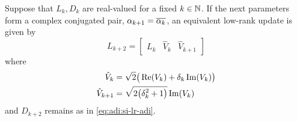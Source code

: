 \begin{corollary}
  Suppose that $L_k, D_k$ are real-valued for a fixed $k\in\N$.
  If the next parameters form a complex conjugated pair,
  $\alpha_{k+1} = \conj{\alpha_k}$,
  an equivalent low-rank update is given by
  \begin{equation*}
    L_{k+2} = \begin{bmatrix}
      L_k &
      \hat V_k &
      \hat V_{k+1}
    \end{bmatrix}
  \end{equation*}
  where
  \begin{align*}
    \hat V_k &= \sqrt{2} \big( \Re(V_k) + \delta_k \Im(V_k) \big) \\
    \hat V_{k+1} &= \sqrt{\smash[b]{2\big( \delta_k^2 + 1 \big)}} \Im(V_k)
  \end{align*}
  and $D_{k+2}$ remains as in \eqref{eq:adi:si-lr-adi}.
\end{corollary}
